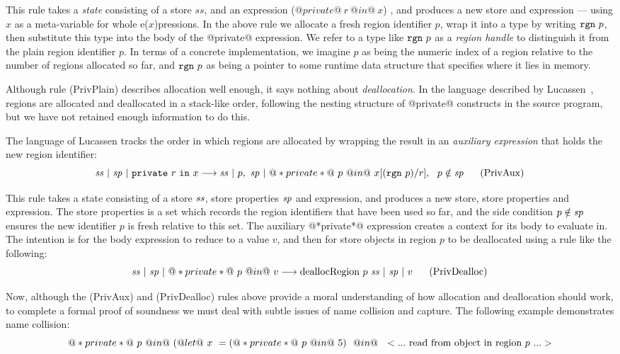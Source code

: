 This rule takes a \emph{state} consisting of a store $ss$, and an expression ($@private@~ r~ @in@~ x$) , and produces a new store and expression --- using $x$ as a meta-variable for whole e($x$)pressions. In the above rule we allocate a fresh region identifier $p$, wrap it into a type by writing $\texttt{rgn}~ p$, then substitute this type into the body of the @private@ expression. We refer to a type like $\texttt{rgn}~ p$ as a \emph{region handle} to distinguish it from the plain region identifier $p$. In terms of a concrete implementation, we imagine $p$ as being the numeric index of a region relative to the number of regions allocated so far, and $\texttt{rgn}~ p$ as being a pointer to some runtime data structure that specifies where it lies in memory.

Although rule (PrivPlain) describes allocation well enough, it says nothing about \emph{deallocation}. In the language described by Lucassen~, regions are allocated and deallocated in a stack-like order, following the nesting structure of @private@ constructs in the source program, but we have not retained enough information to do this.

The language of Lucassen  tracks the order in which regions are allocated by wrapping the result in an \emph{auxiliary expression} that holds the new region identifier:
$$
\mathit{ss} ~|~ \mathit{sp} ~|~ \texttt{private}~ r~ \texttt{in}~ x \longrightarrow \mathit{ss} ~|~ p,~ \mathit{sp} ~|~ @*private*@ ~p~ @in@~ x[(\texttt{rgn}~ p)/r],
~~ p \notin \mathit{sp}
~~~~~ (\textrm{PrivAux})
$$

This rule takes a state consisting of a store $\mathit{ss}$, store properties $\mathit{sp}$ and expression, and produces a new store, store properties and expression. The store properties is a set which records the region identifiers that have been used so far, and the side condition $p \notin \mathit{sp}$ ensures the new identifier $p$ is fresh relative to this set. The auxiliary @*private*@ expression creates a context for its body to evaluate in. The intention is for the body expression to reduce to a value $v$, and then for store objects in region $p$ to be deallocated using a rule like the following:
$$
\mathit{ss} ~|~ \mathit{sp} ~|~ @*private*@ ~p~ @in@~ v \longrightarrow \textrm{deallocRegion}~p~ \mathit{ss} ~|~ \mathit{sp} ~|~ v
~~~~~ (\textrm{PrivDealloc})
$$

Now, although the (PrivAux) and (PrivDealloc) rules above provide a moral understanding of how allocation and deallocation should work, to complete a formal proof of soundness we must deal with subtle issues of name collision and capture. The following example demonstrates name collision:
$$
@*private*@~ p~ @in@~ (@let@~ x~ = (@*private*@~p~ @in@~ 5) ~~@in@~~ <...~\textrm{read from object in region}~ p~...>
$$

